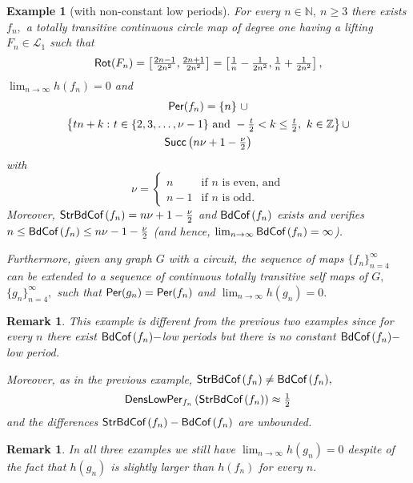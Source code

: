 \documentclass[a4paper, 11pt]{amsart}
\numberwithin{equation}{section}
\theoremstyle{customnumberedtheorem}
\theoremstyle{definitionwithbfnote}
\newtheorem{remark}[theorem]{Remark}
\newtheorem{example}[theorem]{Example}
\newcommand{\N}{\ensuremath{\mathbb{N}}}
\newcommand{\Z}{\ensuremath{\mathbb{Z}}}
\DeclareMathOperator{\bc}{\textsf{\upshape BdCof\,}}
\DeclareMathOperator{\sbc}{\textsf{\upshape StrBdCof\,}}
\DeclareMathOperator{\Per}{\textsf{\upshape Per}}
\DeclareMathOperator{\Rot}{\textsf{\upshape Rot}}
\DeclareMathOperator{\Succ}{\textsf{\upshape Succ}}
\newcommand{\dol}[1][1]{\ensuremath{\mathcal{L}_{#1}}}
\newcommand{\succs}[1]{\ensuremath{\Succ\left(#1\right)}}
\newcommand{\set}[2]{\ensuremath{\left\{#1 \,\colon #2\right\}}}
\begin{document}
\begin{example}[with non-constant low periods]\label{examplemontevideuexampleintroduction}
For every $n \in \N,\ n\ge 3$ there exists $f_n,$  a totally transitive
continuous circle map of degree one having a lifting $F_n \in \dol$
such that
\[
    \Rot(F_n) = \left[\tfrac{2n-1}{2n^2}, \tfrac{2n+1}{2n^2}\right] =
        \left[\tfrac{1}{n}-\tfrac{1}{2n^2},
        \tfrac{1}{n}+\tfrac{1}{2n^2}\right],
\]
$\lim_{n\to\infty} h(f_n) = 0$ and
\begin{multline*}
 \Per(f_n) =
   \{n\}\ \cup\\
   \set{t n + k}{t \in \{2,3,\dots,\nu-1\} \text{ and }
                    -\tfrac{t}{2} < k \le \tfrac{t}{2},\ k \in \Z} \cup \\
   \succs{n\nu+1-\tfrac{\nu}{2}}
\end{multline*}
with
\[
\nu = \begin{cases}
        n & \text{if $n$ is even, and}\\
        n-1 & \text{if $n$ is odd.}
     \end{cases}
\]
Moreover, $\sbc(f_n) = n\nu+1-\tfrac{\nu}{2}$
and $\bc(f_n)$ exists and verifies $n\le \bc(f_n) \le n\nu - 1 -\tfrac{\nu}{2}$
(and hence, $\lim_{n\to\infty} \bc(f_n) = \infty$).
\smallskip

Furthermore, given any graph $G$ with a circuit, the sequence of maps
$\{f_n\}_{n=4}^\infty$ can be extended to a sequence of continuous
totally transitive self maps of $G,$ $\{g_n\}_{n=4}^\infty,$
such that $\Per(g_n) = \Per(f_n)$ and $\lim_{n\to\infty} h(g_n) = 0.$
\end{example}

\begin{remark}\label{rem:examplemontevideuexampleintroduction}
This example is different from the previous two examples
since for every $n$ there exist $\bc(f_n)-$low periods but there is
no constant $\bc(f_n)-$low period.

Moreover, as in the previous example, $\sbc(f_n) \ne \bc(f_n),$
\[
\textsf{DensLowPer}_{f_n}\left(\sbc(f_n)\right)  \approx \tfrac{1}{2}
\]
and the differences $\sbc(f_n) - \bc(f_n)$ are unbounded.
\end{remark}

\begin{remark}
In all three examples we still have $\lim_{n\to\infty} h(g_n) = 0$
despite of the fact that $h(g_n)$ is slightly larger than $h(f_n)$
for every $n.$
\end{remark}
\end{document}
